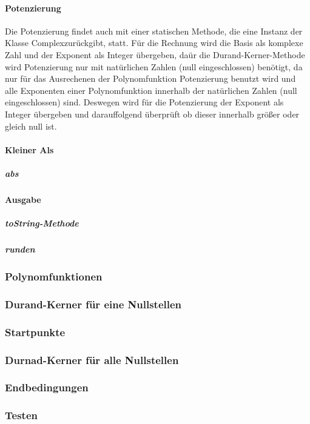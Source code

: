 \documentclass[12pt]{article}
\begin{document}
\paragraph{Potenzierung}
Die Potenzierung findet auch mit einer statischen Methode, die eine Instanz der Klasse \glqq Complex\grqq\space zurückgibt, statt. Für die Rechnung wird die Basis als komplexe Zahl und der Exponent als Integer übergeben, daür die Durand-Kerner-Methode wird Potenzierung nur mit natürlichen Zahlen (null eingeschlossen) benötigt, da nur für das Ausrechenen der Polynomfunktion Potenzierung benutzt wird und alle Exponenten einer Polynomfunktion innerhalb der natürlichen Zahlen (null eingeschlossen) sind. Deswegen wird für die Potenzierung der Exponent als Integer übergeben und darauffolgend überprüft ob dieser innerhalb größer oder gleich null ist.


\paragraph{Kleiner Als}


\subparagraph{abs}

\paragraph{Ausgabe}
\subparagraph{toString-Methode}
\subparagraph{runden}

    
\subsubsection{Polynomfunktionen}
\subsubsection{Durand-Kerner für eine Nullstellen}
\subsubsection{Startpunkte}
\subsubsection{Durnad-Kerner für alle Nullstellen}
\subsubsection{Endbedingungen}
\subsubsection{Testen}
\end{document}

